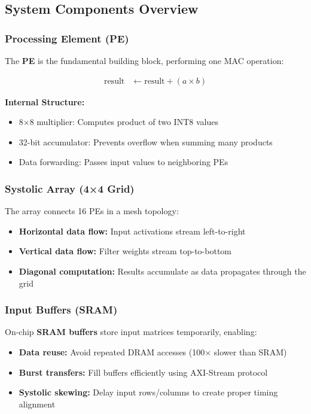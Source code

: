 \documentclass[12pt,a4paper]{article}
\begin{document}
\subsection{System Components Overview}

\subsubsection{Processing Element (PE)}

The \textbf{PE} is the fundamental building block, performing one MAC operation:

\begin{align}
    \text{result} &\leftarrow \text{result} + (a \times b) \nonumber
\end{align}

\textbf{Internal Structure:}
\begin{itemize}
    \item 8×8 multiplier: Computes product of two INT8 values
    \item 32-bit accumulator: Prevents overflow when summing many products
    \item Data forwarding: Passes input values to neighboring PEs
\end{itemize}

\subsubsection{Systolic Array (4×4 Grid)}

The array connects 16 PEs in a mesh topology:
\begin{itemize}
    \item \textbf{Horizontal data flow:} Input activations stream left-to-right
    \item \textbf{Vertical data flow:} Filter weights stream top-to-bottom
    \item \textbf{Diagonal computation:} Results accumulate as data propagates through the grid
\end{itemize}

\subsubsection{Input Buffers (SRAM)}

On-chip \textbf{SRAM buffers} store input matrices temporarily, enabling:
\begin{itemize}
    \item \textbf{Data reuse:} Avoid repeated DRAM accesses (100× slower than SRAM)
    \item \textbf{Burst transfers:} Fill buffers efficiently using AXI-Stream protocol
    \item \textbf{Systolic skewing:} Delay input rows/columns to create proper timing alignment
\end{itemize}
\end{document}
